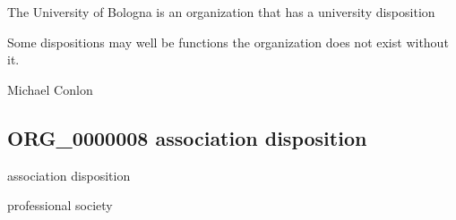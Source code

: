 \documentclass[letterpaper,10pt,english]{sphinxmanual}
\begin{document}
\begin{sphinxShadowBox}

\sphinxAtStartPar
{}
\end{sphinxShadowBox}

\begin{sphinxShadowBox}

\sphinxAtStartPar
The University of Bologna is an organization that has a university disposition
\end{sphinxShadowBox}

\begin{sphinxShadowBox}

\sphinxAtStartPar
Some dispositions may well be functions \textendash{} the organization does not exist without it.
\end{sphinxShadowBox}

\begin{sphinxShadowBox}

\sphinxAtStartPar
Michael Conlon 
\end{sphinxShadowBox}
\begin{quote}

\ignorespaces \end{quote}


\subsection{ORG\_0000008 \sphinxhyphen{} association disposition}
\label{\detokenize{doc-ORG_0000008:org-0000008-association-disposition}}\label{\detokenize{doc-ORG_0000008:index-0}}\label{\detokenize{doc-ORG_0000008::doc}}
\begin{sphinxShadowBox}

\sphinxAtStartPar
association disposition
\end{sphinxShadowBox}

\begin{sphinxShadowBox}

\sphinxAtStartPar
professional society
\end{sphinxShadowBox}
\end{document}
